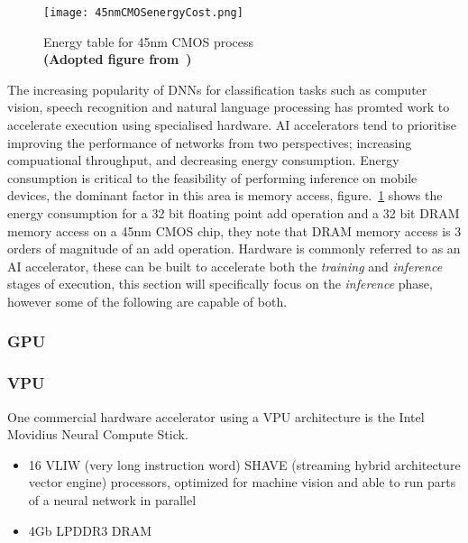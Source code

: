 \documentclass[../../D1.tex]{subfiles}
\begin{document}
 \begin{figure}[H]
    \begin{center}
        \texttt{[image: 45nmCMOSenergyCost.png]} 
    \end{center}
    
    \caption{Energy table for 45nm CMOS process\\ \textbf{(Adopted figure from~\autocite{hanLearningBothWeights2015})}}
    \label{fig:45nmCMOS}   
\end{figure}

 The increasing popularity of DNNs for classification tasks such as computer vision, speech recognition and natural language processing has promted work to accelerate execution using specialised hardware. 
 AI accelerators tend to prioritise improving the performance of networks from two perspectives; increasing compuational throughput, and decreasing energy consumption.
 Energy consumption is critical to the feasibility of performing inference on mobile devices, the dominant factor in this area is memory access, figure.~\ref{fig:45nmCMOS} shows the energy consumption for a 32 bit floating point add operation and a 32 bit DRAM memory access on a 45nm CMOS chip, they note that DRAM memory access is 3 orders of magnitude of an add operation.
 Hardware is commonly referred to as an AI accelerator, these can be built to accelerate both the \emph{training} and \emph{inference} stages of execution, this section will specifically focus on the \emph{inference} phase, however some of the following are capable of both.

\subsubsection{GPU}

\subsubsection{VPU}
One commercial hardware accelerator using a VPU architecture is the Intel Movidius Neural Compute Stick.
\begin{itemize}
    \item 16 VLIW (very long instruction word) SHAVE (streaming hybrid architecture vector engine) processors, optimized for machine vision and able to run parts of a neural network in parallel
    \item 4Gb LPDDR3 DRAM
\end{itemize}
\end{document}
